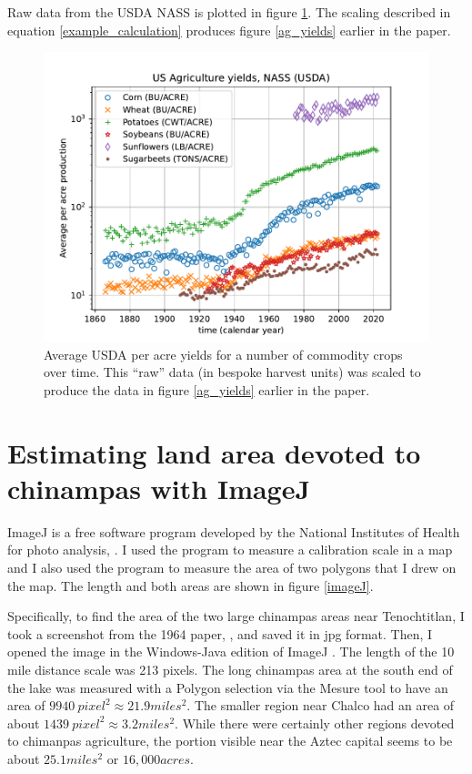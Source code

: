 \documentclass[12pt]{iopart}
\begin{document}
Raw data from the USDA NASS is plotted in figure \ref{raw_production_per_acre}.  The scaling described in equation \ref{example_calculation} produces figure \ref{ag_yields} earlier in the paper.
\begin{figure}[ht!]
\centering
\includegraphics[width=\columnwidth]{raw_production_per_acre.pdf}
\caption{
Average USDA per acre yields for a number of commodity crops over time.  This ``raw'' data (in bespoke harvest units) was scaled to produce the data in figure \ref{ag_yields} earlier in the paper. 
}
\label{raw_production_per_acre}
\end{figure}


\section{Estimating land area devoted to chinampas with ImageJ}
\label{appx_imageJ}

ImageJ is a free software program developed by the National Institutes of Health for photo analysis, \cite{imageJ}.  I used the program to measure a calibration scale in a map and I also used the program to measure the area of two polygons that I drew on the map.  The length and both areas are shown in figure \ref{imageJ}.

Specifically, to find the area of the two large chinampas areas near Tenochtitlan, I took a screenshot from the 1964 paper, \cite{Chinampas_1964}, and saved it in jpg format.  Then, I opened the image in the Windows-Java edition of ImageJ \cite{imageJ}.  The length of the 10 mile distance scale was 213 pixels. The long chinampas area at the south end of the lake was measured with a Polygon selection via the Mesure tool to have an area of $9940~pixel^2\approx21.9miles^2$.  The smaller region near Chalco had an area of about $1439~pixel^2\approx3.2miles^2$.  While there were certainly other regions devoted to chimanpas agriculture, the portion visible near the Aztec capital seems to be about $25.1miles^2$ or $16,000acres$.  
\end{document}

